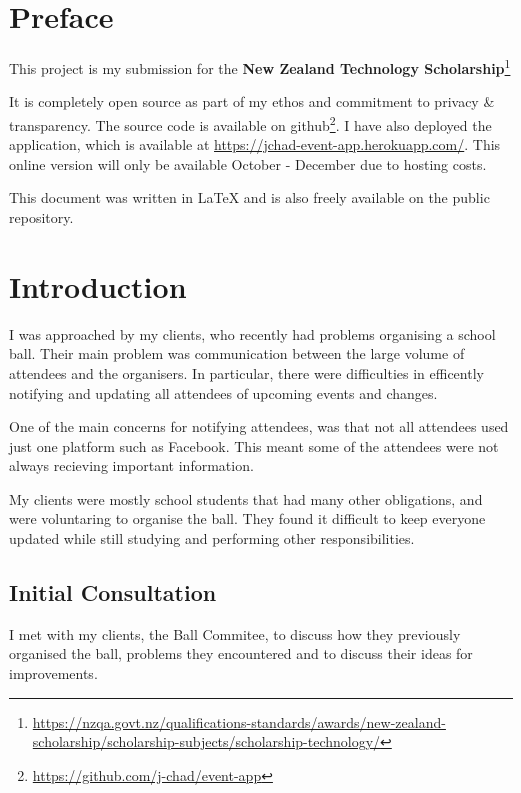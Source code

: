 \documentclass[a4paper,oneside,12pt]{report}
\begin{document}
	\tableofcontents
	\pagebreak

	\chapter{Preface}
	This project is my submission for the \textbf{New Zealand Technology Scholarship}\footnote{\url{https://nzqa.govt.nz/qualifications-standards/awards/new-zealand-scholarship/scholarship-subjects/scholarship-technology/}}

	It is completely open source as part of my ethos and commitment to privacy \& transparency. The source code is available on github\footnote{\url{https://github.com/j-chad/event-app}}. I have also deployed the application, which is available at \url{https://jchad-event-app.herokuapp.com/}. This online version will only be available October - December due to hosting costs.

	This document was written in \LaTeX{} and is also freely available on the public repository.



	\chapter{Introduction}
	I was approached by my clients, who recently had problems organising a school ball. Their main problem was communication between the large volume of attendees and the organisers. In particular, there were difficulties in efficently notifying and updating all attendees of upcoming events and changes.

	One of the main concerns for notifying attendees, was that not all attendees used just one platform such as Facebook. This meant some of the attendees were not always recieving important information.

	My clients were mostly school students that had many other obligations, and were voluntaring to organise the ball. They found it difficult to keep everyone updated while still studying and performing other responsibilities.

	\section{Initial Consultation}
	I met with my clients, the Ball Commitee, to discuss how they previously organised the ball, problems they encountered and to discuss their ideas for improvements.
\end{document}
